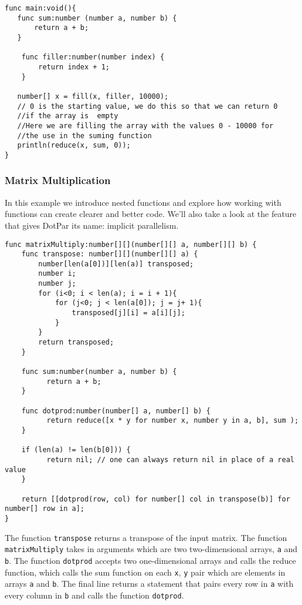 \begin{verbatim}
func main:void(){
   func sum:number (number a, number b) {
       return a + b;
   }

	func filler:number(number index) {
		return index + 1;
	}

   number[] x = fill(x, filler, 10000);
   // 0 is the starting value, we do this so that we can return 0 
   //if the array is  empty
   //Here we are filling the array with the values 0 - 10000 for 
   //the use in the suming function
   println(reduce(x, sum, 0));
}
\end{verbatim}

\subsubsection{Matrix Multiplication}
In this example we introduce nested functions and explore how working with functions can create clearer and better code. We'll also take a look at the feature that gives DotPar its name: implicit parallelism.

\begin{verbatim}
func matrixMultiply:number[][](number[][] a, number[][] b) {
    func transpose: number[][](number[][] a) {
        number[len(a[0])][len(a)] transposed;
        number i;
        number j;
        for (i<0; i < len(a); i = i + 1){
            for (j<0; j < len(a[0]); j = j+ 1){
                transposed[j][i] = a[i][j];
            }
        }
        return transposed;
    }

    func sum:number(number a, number b) {
          return a + b;
    }
    
    func dotprod:number(number[] a, number[] b) {
          return reduce([x * y for number x, number y in a, b], sum );
    }
    
    if (len(a) != len(b[0])) {
          return nil; // one can always return nil in place of a real value
    }
    
    return [[dotprod(row, col) for number[] col in transpose(b)] for number[] row in a];
}
\end{verbatim}

The function \verb=transpose= returns a transpose of the input matrix. The
function \verb=matrixMultiply= takes in arguments which are two two-dimensional
arrays, \verb=a= and \verb=b=. The function \verb=dotprod= accepts two
one-dimensional arrays and calls the reduce function, which calls the sum
function on each \verb=x=, \verb=y= pair which are elements in arrays \verb=a=
and \verb=b=. The final line returns a statement that pairs every row in
\verb=a= with every column in \verb=b= and calls the function \verb=dotprod=.

